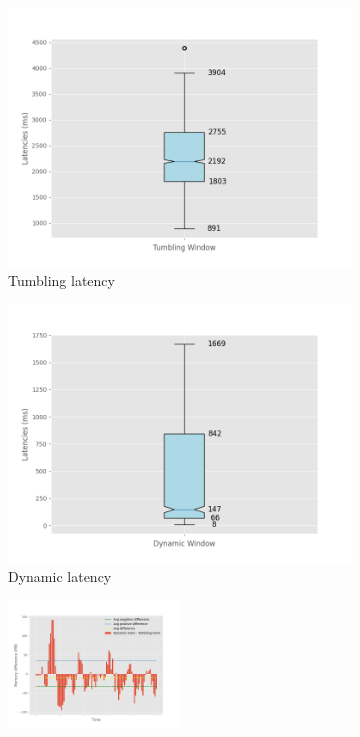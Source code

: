 \begin{figure}
\begin{subfigure}[b]{0.5\textwidth}
        \includegraphics[width=\textwidth]{fig/periodic/TumblingWindow_latency_boxplot.png}
        \caption{Tumbling latency}
        \label{fig:periodic_tumb_boxplot}
    \end{subfigure}
    \hfill 
    \begin{subfigure}[b]{0.5\textwidth}
        \includegraphics[width=\textwidth]{fig/periodic/DynamicWindow_latency_boxplot.png}
        \caption{Dynamic latency}
        \label{fig:periodic_dynamic_boxplot}
    \end{subfigure}
    \begin{subfigure}[b]{\textwidth}
        \centering
        \includegraphics[width=0.5\textwidth]{fig/periodic/mem_difference_bar.png}

\end{subfigure}
\end{figure}
